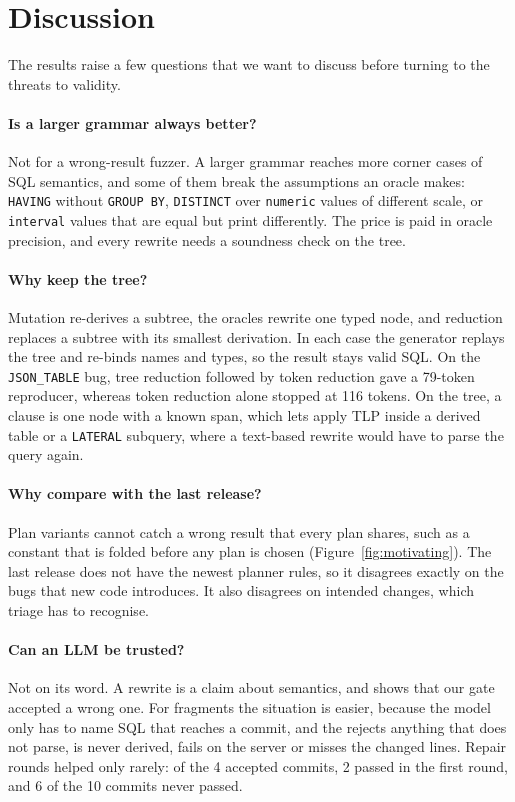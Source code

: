 \section{Discussion}
\label{sec:discussion}

The results raise a few questions that we want to discuss before turning to
the threats to validity.

\paragraph{Is a larger grammar always better?} Not for a wrong-result fuzzer. A
larger grammar reaches more corner cases of SQL semantics, and some of them
break the assumptions an oracle makes: \texttt{HAVING} without \texttt{GROUP
BY}, \texttt{DISTINCT} over \texttt{numeric} values of different scale, or
\texttt{interval} values that are equal but print differently. The price is paid
in oracle precision, and every rewrite needs a soundness check on the tree.

\paragraph{Why keep the tree?} Mutation re-derives a subtree, the oracles
rewrite one typed node, and reduction replaces a subtree with its smallest
derivation. In each case the generator replays the tree and re-binds names and
types, so the result stays valid SQL. On the \texttt{JSON\_TABLE} bug, tree
reduction followed by token reduction gave a 79-token reproducer, whereas token
reduction alone stopped at 116 tokens. On the tree, a clause is one node with a
known span, which lets \tool apply TLP inside a derived table or a
\texttt{LATERAL} subquery, where a text-based rewrite would have to parse the
query again.

\paragraph{Why compare with the last release?} Plan variants cannot catch a
wrong result that every plan shares, such as a constant that is folded before
any plan is chosen (Figure~\ref{fig:motivating}). The last release does not have
the newest planner rules, so it disagrees exactly on the bugs that new code
introduces. It also disagrees on intended changes, which triage has to
recognise.

\paragraph{Can an LLM be trusted?} Not on its word. A rewrite is a claim about
semantics, and  shows that our gate accepted a wrong one. For
fragments the situation is easier, because the model only has to name SQL that
reaches a commit, and the \gate rejects anything that does not parse, is never
derived, fails on the server or misses the changed lines. Repair rounds helped
only rarely: of the 4 accepted commits, 2 passed in the first round,
and 6 of the 10 commits never passed.

